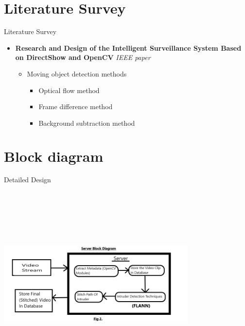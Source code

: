 \documentclass{beamer}
\begin{document}
\section{Literature Survey} 
\begin{frame}{Literature Survey}
  \begin{itemize}
    \item \textbf {Research and Design of the Intelligent Surveillance System Based on DirectShow and OpenCV}
          \newline 
          \textit{IEEE paper}
          \begin{itemize}
            \item Moving object detection methods
              \begin{itemize}
              \item Optical flow method
              \item Frame difference method
              \item Background subtraction method
              \end{itemize}
          \end{itemize}
   
  \end{itemize}
\end{frame}


\section{Block diagram}
\begin{frame}{Detailed Design}
  \begin{center}
    \includegraphics[width=10cm, height=10cm, keepaspectratio]{DetailedDesign1.png}
  \end{center}
\end{frame}
\end{document}
